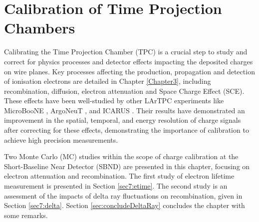 
\chapter{Calibration of Time Projection Chambers}
\label{ChapterCalib}
\ifpdf
    \graphicspath{{Chapter8/Figs/Raster/}{Chapter8/Figs/PDF/}{Chapter8/Figs/}}
\else
    \graphicspath{{Chapter8/Figs/Vector/}{Chapter8/Figs/}}
\fi

Calibrating the Time Projection Chamber (TPC) is a crucial step to study and correct for physics processes and detector effects impacting the deposited charges on wire planes.
Key processes affecting the production, propagation and detection of ionisation electrons are detailed in Chapter \ref{Chapter3}, including recombination, diffusion, electron attenuation and Space Charge Effect (SCE).
These effects have been well-studied by other LArTPC experiments like MicroBooNE \cite{uboone_calib, ubooneEtime}, ArgoNeuT \cite{argoneut_recomb}, and ICARUS \cite{icarus_recomb, GrayDiffusion}.
Their results have demonstrated an improvement in the spatial, temporal, and energy resolution of charge signals after correcting for these effects, demonstrating the importance of calibration to achieve high precision measurements.

Two Monte Carlo (MC) studies within the scope of charge calibration at the Short-Baseline Near Detector (SBND) are presented in this chapter, focusing on electron attenuation and recombination.
The first study of electron lifetime measurement is presented in Section \ref{sec7:etime}.
The second study is an assessment of the impacts of delta ray fluctuations on recombination, given in Section \ref{sec7:delta}.
Section \ref{sec:concludeDeltaRay} concludes the chapter with some remarks.


